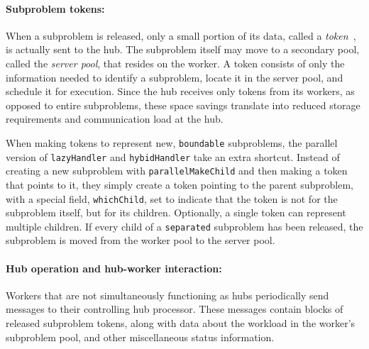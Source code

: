 \paragraph{Subproblem tokens:}
When a subproblem is released, only a small portion of its data,
called a \emph{token}~\cite{RRM93,Eck94}, is actually sent to the hub.
The subproblem itself may move to a secondary pool, called the
\emph{server pool}, that resides on the worker.  A token consists of
only the information needed to identify a subproblem, locate it in the
server pool, and schedule it for execution.  Since the hub receives
only tokens from its workers, as opposed to entire subproblems, these
space savings translate into reduced storage requirements and
communication load at the hub.

When making tokens to represent new, \texttt{boundable} subproblems,
the parallel version of \texttt{lazyHandler} and \texttt{hybidHandler}
take an extra shortcut.  Instead of creating a new subproblem with
\texttt{parallelMakeChild} and then making a token that points to it,
they simply create a token pointing to the parent subproblem, with a
special field, \texttt{whichChild}, set to indicate that the token is
not for the subproblem itself, but for its children.  Optionally, a
single token can represent multiple children.  If every child of a
\texttt{separated} subproblem has been released, the subproblem is
moved from the worker pool to the server pool.

\paragraph{Hub operation and hub-worker interaction:}
Workers that are not simultaneously functioning as hubs periodically
send messages to their controlling hub processor.  These messages
contain blocks of released subproblem tokens, along with data about
the workload in the worker's subproblem pool, and other miscellaneous
status information.

